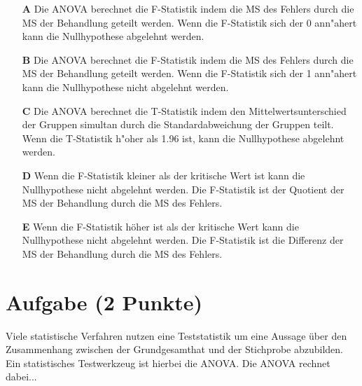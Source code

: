\documentclass[a4paper, 9pt]{scrartcl}\usepackage[]{graphicx}\usepackage[]{xcolor}
\begin{document}
\begin{enumerate}
\item [\textbf{A} \msquare] Die ANOVA berechnet die F-Statistik indem die MS des Fehlers durch die MS der Behandlung geteilt werden. Wenn die F-Statistik sich der 0 ann{"a}hert kann die Nullhypothese abgelehnt werden.
\item [\textbf{B} \msquare] Die ANOVA berechnet die F-Statistik indem die MS des Fehlers durch die MS der Behandlung geteilt werden. Wenn die F-Statistik sich der 1 ann{"a}hert kann die Nullhypothese nicht abgelehnt werden.
\item [\textbf{C} \msquare] Die ANOVA berechnet die T-Statistik indem den Mittelwertsunterschied der Gruppen simultan durch die Standardabweichung der Gruppen teilt. Wenn die T-Statistik h{"o}her als 1.96 ist, kann die Nullhypothese abgelehnt werden.
\item [\textbf{D} \msquare] Wenn die F-Statistik kleiner als der kritische Wert ist kann die Nullhypothese nicht abgelehnt werden. Die F-Statistik ist der Quotient der MS der Behandlung durch die MS des Fehlers.
\item [\textbf{E} \msquare] Wenn die F-Statistik höher ist als der kritische Wert kann die Nullhypothese nicht abgelehnt werden. Die F-Statistik ist die Differenz der MS der Behandlung durch die MS des Fehlers.
\end{enumerate} 

\section{Aufgabe \hfill (2 Punkte)}




Viele statistische Verfahren nutzen eine Teststatistik um eine Aussage über den Zusammenhang zwischen der Grundgesamthat und der Stichprobe abzubilden. Ein statistisches Testwerkzeug ist hierbei die ANOVA. Die ANOVA rechnet dabei...
\end{document}
